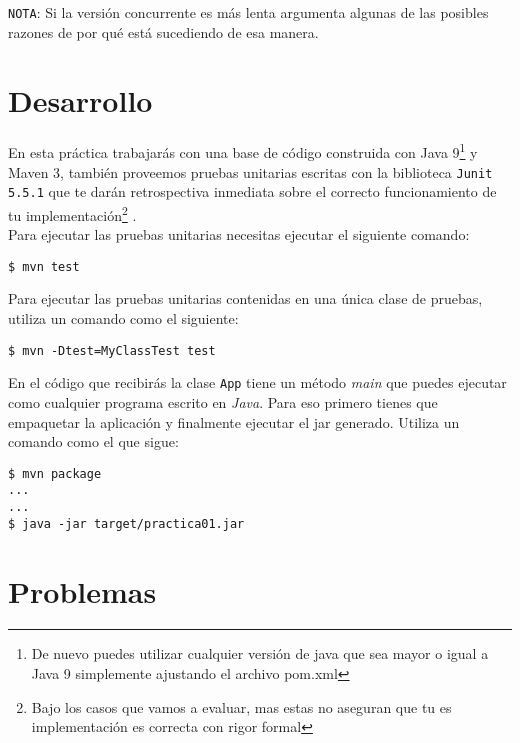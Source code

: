 \documentclass[a4paper,11pt]{article}
\begin{document}
	\verb|NOTA|: Si la versión concurrente es más lenta argumenta algunas de las posibles razones de por qué está sucediendo de esa manera.

	\section{Desarrollo}
	En esta práctica trabajarás con una base de código construida con Java 9\footnote{De nuevo puedes utilizar cualquier versión de java que sea mayor o igual a Java 9 simplemente ajustando el archivo pom.xml}  y Maven 3, también proveemos pruebas unitarias escritas con la biblioteca \verb|Junit 5.5.1| que te darán retrospectiva inmediata sobre el correcto funcionamiento de tu implementación\footnote{Bajo los casos que vamos a evaluar, mas estas no aseguran que tu es implementación es correcta con rigor formal} . \\
	Para ejecutar las pruebas unitarias necesitas ejecutar el siguiente comando: \\

	\begin{tcolorbox}
		\begin{lstlisting}
$ mvn test
		\end{lstlisting}
	\end{tcolorbox}

	Para ejecutar las pruebas unitarias contenidas en una única clase de pruebas, utiliza un comando como el siguiente: \\

	\begin{tcolorbox}
		\begin{lstlisting}
$ mvn -Dtest=MyClassTest test
		\end{lstlisting}
	\end{tcolorbox}

	En el código que recibirás la clase \verb|App| tiene un método \emph{main} que puedes ejecutar como cualquier programa escrito en \emph{Java}. Para eso primero tienes que empaquetar la aplicación y finalmente ejecutar el jar generado. Utiliza un comando como el que sigue: \\

	\begin{tcolorbox}
		\begin{lstlisting}
$ mvn package
... 
...
$ java -jar target/practica01.jar
		\end{lstlisting}
	\end{tcolorbox}

	\section{Problemas}
\end{document}
